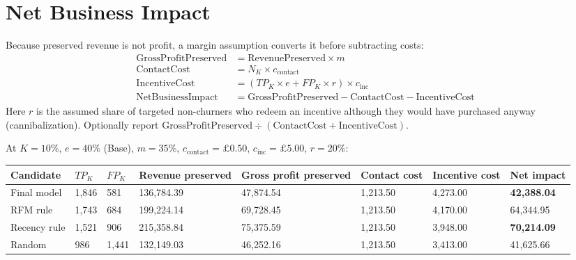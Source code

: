 \section{Net Business Impact}
\label{sec:7-9}

Because preserved revenue is not profit, a margin assumption converts it before subtracting costs:
\begin{align*}
    \text{GrossProfitPreserved} &= \text{RevenuePreserved} \times m \\
    \text{ContactCost} &= N_K \times c_{\text{contact}} \\
    \text{IncentiveCost} &= (TP_K \times e + FP_K \times r) \times c_{\text{inc}} \\
    \text{NetBusinessImpact} &= \text{GrossProfitPreserved} - \text{ContactCost} - \text{IncentiveCost}
\end{align*}
Here $r$ is the assumed share of targeted non-churners who redeem an incentive although they would have purchased anyway (cannibalization). Optionally report $\text{GrossProfitPreserved} \div (\text{ContactCost} + \text{IncentiveCost})$.

At $K=10\%$, $e=40\%$ (Base), $m=35\%$, $c_{\text{contact}}=\pounds0.50$, $c_{\text{inc}}=\pounds5.00$, $r=20\%$:

\begin{center}
\footnotesize
\setlength{\tabcolsep}{3pt}
\begin{tabular}{@{}p{2.2cm}p{1.3cm}p{1.3cm}p{1.6cm}p{1.9cm}p{1.6cm}p{1.6cm}p{1.9cm}@{}}
    \toprule
    Candidate & $TP_K$ & $FP_K$ & Revenue preserved & Gross profit preserved & Contact cost & Incentive cost & Net impact \\
    \midrule
    Final model & 1,846 & 581 & 136,784.39 & 47,874.54 & 1,213.50 & 4,273.00 & \textbf{42,388.04} \\
    RFM rule & 1,743 & 684 & 199,224.14 & 69,728.45 & 1,213.50 & 4,170.00 & 64,344.95 \\
    Recency rule & 1,521 & 906 & 215,358.84 & 75,375.59 & 1,213.50 & 3,948.00 & \textbf{70,214.09} \\
    Random & 986 & 1,441 & 132,149.03 & 46,252.16 & 1,213.50 & 3,413.00 & 41,625.66 \\
    \bottomrule
\end{tabular}
\end{center}


